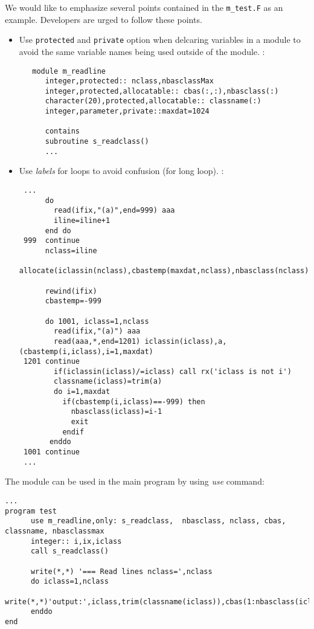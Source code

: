\documentclass[a4paper,10pt,fleqn]{article}
\begin{document}
We would like to emphasize several points contained in the \verb#m_test.F# as an example. Developers are urged to follow these points.
\begin{itemize}
 \item Use \verb#protected# and \verb#private# option when delcaring variables in a module to avoid the same variable names being used outside of the module. :
 \begin{verbatim}
   module m_readline
      integer,protected:: nclass,nbasclassMax     
      integer,protected,allocatable:: cbas(:,:),nbasclass(:)
      character(20),protected,allocatable:: classname(:)
      integer,parameter,private::maxdat=1024
      
      contains
      subroutine s_readclass()
      ...  
 \end{verbatim}

 \item Use {\it labels} for loops to avoid confusion (for long loop). : 
 \begin{verbatim}
 ...
      do 
        read(ifix,"(a)",end=999) aaa
        iline=iline+1
      end do
 999  continue
      nclass=iline
      allocate(iclassin(nclass),cbastemp(maxdat,nclass),nbasclass(nclass),classname(nclass))

      rewind(ifix)
      cbastemp=-999
      
      do 1001, iclass=1,nclass
        read(ifix,"(a)") aaa 
        read(aaa,*,end=1201) iclassin(iclass),a,(cbastemp(i,iclass),i=1,maxdat)
 1201 continue
        if(iclassin(iclass)/=iclass) call rx('iclass is not i')
        classname(iclass)=trim(a)      
        do i=1,maxdat
          if(cbastemp(i,iclass)==-999) then
            nbasclass(iclass)=i-1
            exit
          endif
       enddo  
 1001 continue
 ...
 \end{verbatim}
\end{itemize} 

The module can be used in the main program by using {\it use} command:
\begin{verbatim}
...
program test
      use m_readline,only: s_readclass,  nbasclass, nclass, cbas, classname, nbasclassmax
      integer:: i,ix,iclass
      call s_readclass()

      write(*,*) '=== Read lines nclass=',nclass
      do iclass=1,nclass
        write(*,*)'output:',iclass,trim(classname(iclass)),cbas(1:nbasclass(iclass),iclass)
      enddo
end
\end{verbatim}
\end{document}
